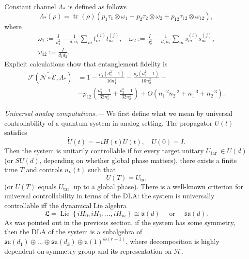 \documentclass[twocolumn,superscriptaddress,aps,showpacs,amsmath,amstex,amssymb,citeautoscript,floatfix,pra,preprintnumbers]{revtex4-2}
\newcounter{alg}
\theoremstyle{plain}
\theoremstyle{plain}
\theoremstyle{plain}
\theoremstyle{plain}
\theoremstyle{plain}
\theoremstyle{plain}
\begin{document}
Constant channel $\Lambda_*$ is defined as follows
\[  
    \Lambda_*(\rho)=\operatorname{tr}(\rho) \left(p_1\tau_1 \otimes \omega_1+p_2\tau_2 \otimes \omega_2+p_{12}\tau_{12} \otimes \omega_{12}\right),
\]
where
\[
\begin{gathered}
    \omega_1:=\frac{I}{d_1^2}-\frac{1}{d_1 n_1} \sum_m t_m^{(i)} t_m^{(j)}, \quad \omega_2:=\frac{I}{d_2^2}-\frac{1}{d_2 n_2} \sum_m s_m^{(i)} s_m^{(j)}, \\ \omega_{12}:=\frac{I}{d_1 d_2}.
\end{gathered}
\]
Explicit calculations show that entanglement fidelity is 
\[
\begin{aligned}
        \mathcal{F}\left(\widehat{\mathcal{N} \circ \mathcal{E}}, \Lambda_*\right)&=1-\frac{p_1\left(d_1^2-1\right)}{16 n_1^2}-\frac{p_2\left(d_2^2-1\right)}{16 n_2^2}-\\&-p_{12}\left(\frac{d_1^2-1}{32 n_1^2}+\frac{d_2^2-1}{32 n_2^2}\right)+O\left(n_1^{-2} n_2^{-2}+n_1^{-3}+n_2^{-3}\right).
\end{aligned}
\]


\textit{Universal analog computations.---} 
We first define what we mean by universal controllability of a quantum system in analog setting.
The propagator $U(t)$ satisfies
$$
\dot{U}(t)=-i H(t) U(t), \quad U(0)=I .
$$
Then the system is unitarily controllable if for every target unitary $U_{\text {tar }} \in U(d)$ (or $S U(d)$, depending on whether global phase matters), there exists a finite time $T$ and controls $u_k(t)$ such that
$$
    U(T)=U_{\operatorname{tar}}
$$
(or $U(T)$ equals $U_{\text {tar }}$ up to a global phase).
There is a well-known criterion for universal controllability in terms of the DLA: the system is universally controllable iff the dynamical Lie algebra
    $$
    \mathfrak{L}=\operatorname{Lie}\left\{i H_0, i H_1, \ldots, i H_m\right\}\cong
    \mathfrak{u}(d) \quad \text { or } \quad \mathfrak{s} \mathfrak{u}(d) .
    $$
As was pointed out in the previous section, if the system has some symmetry, then the DLA of the system is a subalgebra
of $\mathfrak{su}(d_1)\oplus...\oplus\mathfrak{su}(d_k)\oplus \mathfrak{u}(1)^{\oplus(r-1)}$,
where decomposition is highly dependent on symmetry group and its representation on $\mathcal{H}$. 
\end{document}
